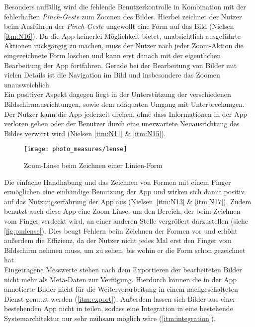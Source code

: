 Besonders auffällig wird die fehlende Benutzerkontrolle in Kombination mit der fehlerhaften \emph{Pinch-Geste} zum Zoomen des Bildes.
Hierbei zeichnet der Nutzer beim Ausführen der \emph{Pinch-Geste} ungewollt eine Form auf das Bild (Nielsen \autoref{itm:N16}).
Da die App keinerlei Möglichkeit bietet, unabsichtlich ausgeführte Aktionen rückgängig zu machen, muss der Nutzer nach jeder Zoom-Aktion die eingezeichnete Form löschen und kann erst danach mit der eigentlichen Bearbeitung der App fortfahren.
Gerade bei der Bearbeitung von Bilder mit vielen Details ist die Navigation im Bild und insbesondere das Zoomen unausweichlich. \\

Ein positiver Aspekt dagegen liegt in der Unterstützung der verschiedenen Bildschirmausrichtungen, sowie dem adäquaten Umgang mit Unterbrechungen.
Der Nutzer kann die App jederzeit drehen, ohne dass Informationen in der App verloren gehen oder der Benutzer durch eine unerwartete Neuausrichtung des Bildes verwirrt wird (Nielsen \autoref{itm:N11} \& \autoref{itm:N15}). \\

\begin{wrapfigure}{R}{0.4\textwidth}
  \centering
  \texttt{[image: photo\_measures/lense]}
  \caption{Zoom-Linse beim Zeichnen einer Linien-Form}
  \label{fig:pmlense}
\end{wrapfigure}

Die einfache Handhabung und das Zeichnen von Formen mit einem Finger ermöglichen eine einhändige Benutzung der App und wirken sich damit positiv auf das Nutzungserfahrung der App aus (Nielsen~\autoref{itm:N13} \& \autoref{itm:N17}).
Zudem benutzt auch diese App eine Zoom-Linse, um den Bereich, der beim Zeichnen vom Finger verdeckt wird, an einer anderen Stelle vergrößert darzustellen (siehe \autoref{fig:pmlense}).
Dies beugt Fehlern beim Zeichnen der Formen vor und erhöht außerdem die Effizienz, da der Nutzer nicht jedes Mal erst den Finger vom Bildschirm nehmen muss, um zu sehen, bis wohin er die Form schon gezeichnet hat. \\

Eingetragene Messwerte stehen nach dem Exportieren der bearbeiteten Bilder nicht mehr als Meta-Daten zur Verfügung.
Hierdurch können die in der App annotierte Bilder nicht für die Weiterverarbeitung in einem nachgeschalteten Dienst genutzt werden (\autoref{itm:export}).
Außerdem lassen sich Bilder aus einer bestehenden App nicht in \pm{} teilen, sodass eine Integration in eine bestehende Systemarchitektur nur sehr mühsam möglich wäre (\autoref{itm:integration}). \\

